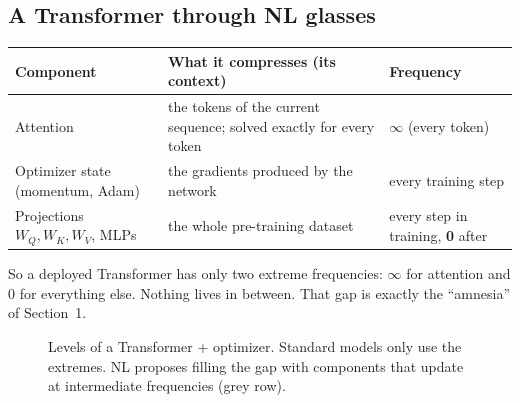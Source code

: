 \documentclass[11pt,a4paper]{article}
\begin{document}
\subsection{A Transformer through NL glasses}
\begin{center}
\begin{tabularx}{\textwidth}{lXl}
\toprule
\textbf{Component} & \textbf{What it compresses (its context)} & \textbf{Frequency}\\
\midrule
Attention & the tokens of the current sequence; solved exactly for every token & $\infty$ (every token)\\
Optimizer state (momentum, Adam) & the gradients produced by the network & every training step\\
Projections $W_Q,W_K,W_V$, MLPs & the whole pre-training dataset & every step in training, \textbf{0} after\\
\bottomrule
\end{tabularx}
\end{center}
So a deployed Transformer has only two extreme frequencies: $\infty$ for attention and $0$ for everything else. Nothing lives in between. That gap is exactly the ``amnesia'' of Section~1.

\begin{figure}[h]
\centering
{}
\caption{Levels of a Transformer + optimizer. Standard models only use the extremes. NL proposes filling the gap with components that update at intermediate frequencies (grey row).}
\end{figure}
\end{document}
